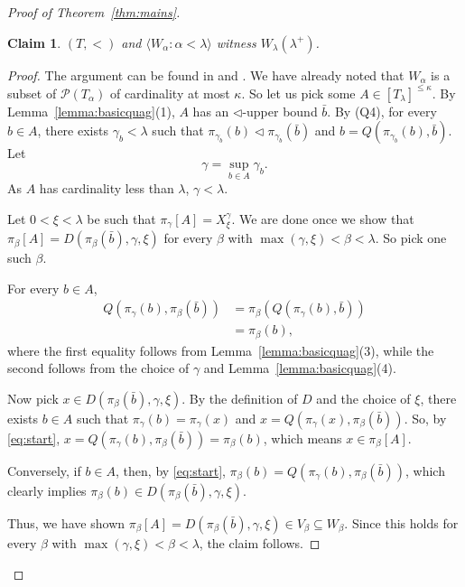 \documentclass[]{amsart}
\newtheorem{claim}{Claim}[theorem]
\theoremstyle{definition}
\theoremstyle{remark}
\begin{document}
\begin{proof}[Proof of Theorem~\ref{thm:mains}]
\begin{claim}\label{claim:1}
$(T, <)$ and $\langle W_\alpha : \alpha < \lambda\rangle$ witness $W_\lambda(\lambda^+)$.
\end{claim}
\begin{proof}
The argument can be found in \cite[\S 3]{MR555420} and \cite[Theorem 4]{MR823780}. We have already noted that $W_\alpha$ is a subset of $\mathcal{P}(T_\alpha)$ of cardinality at most $\kappa$. So let us pick some $A \in [T_{\lambda}]^{\le \kappa}$. By Lemma~\ref{lemma:basicquag}(1), $A$ has an $\lhd$-upper bound $\bar{b}$. By (Q4), for every $b \in A$, there exists $\gamma_b < \lambda$ such that $\pi_{\gamma_b}(b) \lhd \pi_{\gamma_b}(\bar{b})$ and $b = Q(\pi_{\gamma_b}(b), \bar{b})$. Let 
\[
\gamma = \sup_{b \in A} \gamma_b.
\]
 As $A$ has cardinality less than $\lambda$, $\gamma < \lambda$.

Let $0 < \xi < \lambda$ be such that $\pi_\gamma[A] = X^\gamma_\xi$. We are done once we show that $\pi_\beta[A] = D(\pi_\beta(\bar{b}), \gamma, \xi)$ for every $\beta$ with $\max(\gamma, \xi) < \beta < \lambda$. So pick one such $\beta$.

For every $b \in A$,
\begin{equation}\label{eq:start}
\begin{split}
Q(\pi_\gamma(b), \pi_\beta(\bar{b})) &= \pi_\beta(Q(\pi_\gamma(b), \bar{b}))\\&= \pi_\beta(b),
\end{split}
\end{equation}
where the first equality follows from Lemma~\ref{lemma:basicquag}(3), while the second follows from the choice of $\gamma$ and Lemma~\ref{lemma:basicquag}(4).

Now pick $x \in D(\pi_\beta(\bar{b}), \gamma, \xi)$. By the definition of $D$ and the choice of $\xi$, there exists $b \in A$ such that $\pi_\gamma(b) = \pi_\gamma(x)$ and $x = Q(\pi_\gamma(x), \pi_\beta(\bar{b}))$. So, by \eqref{eq:start}, $x = Q(\pi_\gamma(b), \pi_\beta(\bar{b})) = \pi_\beta(b)$, which means $x \in \pi_\beta[A]$.

Conversely, if $b \in A$, then, by \eqref{eq:start}, $\pi_\beta(b) = Q(\pi_\gamma(b), \pi_\beta(\bar{b}))$, which clearly implies $\pi_\beta(b) \in D(\pi_\beta(\bar{b}), \gamma, \xi)$. 

Thus, we have shown $\pi_\beta[A] = D(\pi_\beta(\bar{b}), \gamma, \xi) \in V_\beta \subseteq W_\beta$. Since this holds for every $\beta$ with $\max(\gamma, \xi) < \beta < \lambda$, the claim follows.
\end{proof}



\end{proof}
\end{document}
